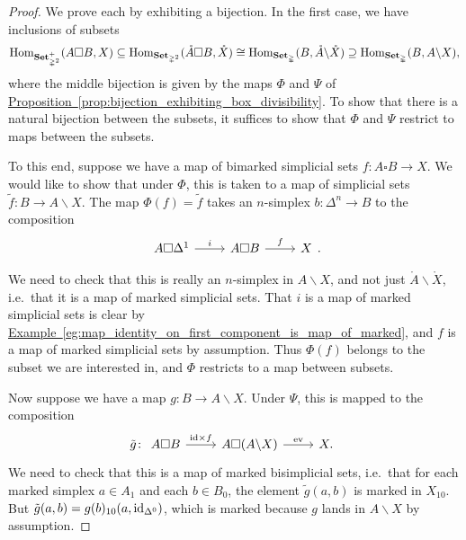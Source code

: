 \documentclass[main.tex]{subfiles}
\begin{document}
\begin{proof}
  We prove each by exhibiting a bijection. In the first case, we have inclusions of subsets
  \begin{equation*}
    \mathrm{Hom}_{\mathbf{Set}_{\mathbb{\Delta}^{2}}^{+}}(A \square B, X) \subseteq \mathrm{Hom}_{\mathbf{Set}_{\mathbb{\Delta}^{2}}}(\mathring{A} \square B, \mathring{X}) \cong \mathrm{Hom}_{\mathbf{Set}_{\mathbb{\Delta}}}(B, \mathring{A} \backslash \mathring{X}) \supseteq \mathrm{Hom}_{\mathbf{Set}_{\mathbb{\Delta}}}(B, A \backslash X),
  \end{equation*}
  where the middle bijection is given by the maps $\Phi$ and $\Psi$ of \hyperref[prop:bijection_exhibiting_box_divisibility]{Proposition~\ref*{prop:bijection_exhibiting_box_divisibility}}. To show that there is a natural bijection between the subsets, it suffices to show that $\Phi$ and $\Psi$ restrict to maps between the subsets.

  To this end, suppose we have a map of bimarked simplicial sets $f\colon A \square B \to X$. We would like to show that under $\Phi$, this is taken to a map of simplicial sets $\tilde{f}\colon B \to A \backslash X$. The map $\Phi(f) = \tilde{f}$ takes an $n$-simplex $b\colon \Delta^{n} \to B$ to the composition
  \begin{equation*}
    \begin{tikzcd}
      A \square \Delta^{1}
      \arrow[r, "i"]
      & A \square B
      \arrow[r, "f"]
      & X
    \end{tikzcd}.
  \end{equation*}

  We need to check that this is really an $n$-simplex in $A \backslash X$, and not just $\mathring{A} \backslash \mathring{X}$, i.e.\ that it is a map of marked simplicial sets. That $i$ is a map of marked simplicial sets is clear by \hyperref[eg:map_identity_on_first_component_is_map_of_marked]{Example~\ref*{eg:map_identity_on_first_component_is_map_of_marked}}, and $f$ is a map of marked simplicial sets by assumption. Thus $\Phi(f)$ belongs to the subset we are interested in, and $\Phi$ restricts to a map between subsets.

  Now suppose we have a map $g\colon B \to A \backslash X$. Under $\Psi$, this is mapped to the composition
  \begin{equation*}
    \tilde{g}\colon
    \begin{tikzcd}
      A \square B
      \arrow[r, "\id \times f"]
      & A \square (A \backslash X)
      \arrow[r, "\ev"]
      & X.
    \end{tikzcd}
  \end{equation*}
  We need to check that this is a map of marked bisimplicial sets, i.e.\ that for each marked simplex $a \in A_{1}$ and each $b \in B_{0}$, the element $\tilde{g}(a, b)$ is marked in $X_{10}$. But $\tilde{g}(a, b) = g(b)_{10}(a, \mathrm{id}_{\Delta^{0}})$, which is marked because $g$ lands in $A \backslash X$ by assumption.


\end{proof}
\end{document}

